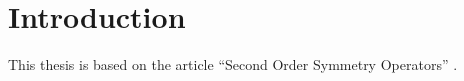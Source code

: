 
\chapter{Introduction}

This thesis is based on the article \enquote{Second Order Symmetry Operators} \cite{AndBaeBlu14a}.


